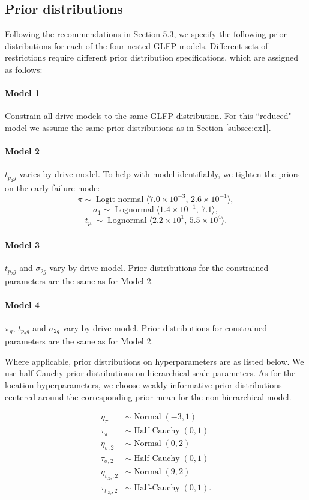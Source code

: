 \documentclass[12pt]{article}
\newcommand{\op}{\operatorname}
\begin{document}
\subsection{Prior distributions}
\label{sec:Prior distributions}
Following the recommendations in Section 5.3, we specify the following prior distributions for each of the four nested GLFP models. Different sets of restrictions require different prior distribution specifications, which are assigned as follows:

\paragraph{Model 1} Constrain all drive-models to the same GLFP distribution. For this ``reduced" model we assume the same prior distributions as in Section \ref{subsec:ex1}.

\paragraph{Model 2} $t_{p_{2}g}$ varies by drive-model. To help with model identifiably, we tighten the priors on the early failure mode:
$$ \pi \sim \op{Logit-normal}\langle 7.0\times 10^{-3},\, 2.6 \times 10^{-1} \rangle,$$
$$\sigma_1 \sim \op{Lognormal}\langle 1.4 \times 10^{-1},\, 7.1\rangle,$$ 
$$t_{p_1} \sim \op{Lognormal} \langle 2.2 \times 10^1,\, 5.5 \times 10^{4} \rangle.$$

\paragraph{Model 3} $t_{p_{2}g}$ and $\sigma_{2g}$ vary by drive-model. Prior distributions for the constrained parameters are the same as for Model 2.

\paragraph{Model 4} $\pi_g$, $t_{p_{2}g}$ and $\sigma_{2g}$ vary by drive-model. Prior distributions for constrained parameters are the same as for Model 2.


Where applicable, prior distributions on hyperparameters are as listed below. We use half-Cauchy prior distributions on hierarchical scale parameters. As for the location hyperparameters, we choose weakly informative prior distributions centered around the corresponding prior mean for the non-hierarchical model.


\begin{align*}
  \eta_{\pi} & \sim \op{Normal}(-3, 1)\\
  \tau_{\pi} & \sim \op{Half-Cauchy}(0, 1)\\
  \eta_{\sigma ,2} & \sim \op{Normal}(0, 2)\\
  \tau_{\sigma ,2} & \sim \op{Half-Cauchy}(0, 1)\\
  \eta_{t_{.2_2},2} & \sim \op{Normal}(9, 2)\\
  \tau_{t_{.2_2},2} & \sim \op{Half-Cauchy}(0, 1).
 \end{align*} 
\end{document}
